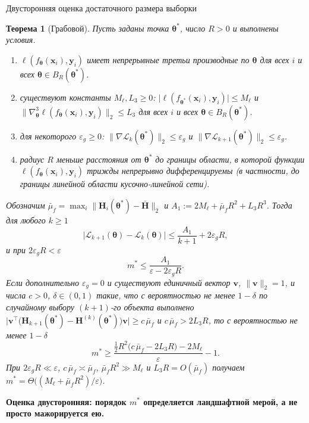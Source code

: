 \documentclass[9pt,pdf,hyperref={unicode}]{beamer}
\newtheorem{rustheorem}{Теорема}
\newcommand{\key}[1]{\par\vspace{0.5ex}\noindent\textbf{\color{darkgreen}#1}}
\begin{document}
\begin{frame}{Двусторонняя оценка достаточного размера выборки}
\justifying
\footnotesize
\begin{rustheorem}[Грабовой]
    Пусть заданы точка $\boldsymbol{\theta}^*$, число $R>0$ и выполнены условия.
    \begin{enumerate}[1)]
        \item $\ell(f_{\boldsymbol{\theta}}(\mathbf{x}_i),\mathbf{y}_i)$ имеет непрерывные третьи производные по $\boldsymbol{\theta}$ для всех $i$ и всех $\boldsymbol{\theta}\in B_R(\boldsymbol{\theta}^*)$.
        \item существуют константы $M_\ell,L_3\ge 0$: $\bigl|\ell(f_{\boldsymbol{\theta}^*}(\mathbf{x}_i),\mathbf{y}_i)\bigr|\le M_\ell$ и $\bigl\|\nabla^{3}_{\boldsymbol{\theta}}\ell(f_{\boldsymbol{\theta}}(\mathbf{x}_i),\mathbf{y}_i)\bigr\|_2\le L_3$ для всех $i$ и всех $\boldsymbol{\theta}\in B_R(\boldsymbol{\theta}^*)$.
        \item для некоторого $\varepsilon_g\ge 0$: $\bigl\|\nabla\mathcal{L}_k(\boldsymbol{\theta}^*)\bigr\|_2\le\varepsilon_g$ и $\bigl\|\nabla\mathcal{L}_{k+1}(\boldsymbol{\theta}^*)\bigr\|_2\le\varepsilon_g$.
        \item радиус $R$ меньше расстояния от $\boldsymbol{\theta}^*$ до границы области, в которой функции $\ell(f_{\boldsymbol{\theta}}(\mathbf{x}_i),\mathbf{y}_i)$ трижды непрерывно дифференцируемы (в частности, до границы линейной области кусочно-линейной сети).
    \end{enumerate}
    Обозначим $\bar\mu_f=\max_i\|\mathbf{H}_i(\boldsymbol{\theta}^*)-\bar{\mathbf{H}}\|_2$ и $A_1:=2M_\ell+\bar\mu_f R^2+L_3 R^3$. Тогда для любого $k\ge 1$
    \[
        \bigl|\mathcal{L}_{k+1}(\boldsymbol{\theta})-\mathcal{L}_k(\boldsymbol{\theta})\bigr|
        \le\frac{A_1}{k+1}+2\varepsilon_gR,
    \]
    и при $2\varepsilon_gR<\varepsilon$
    \[
        m^*\le\frac{A_1}{\varepsilon-2\varepsilon_gR}.
    \]
    Если дополнительно $\varepsilon_g=0$ и существуют единичный вектор $\mathbf{v}$, $\|\mathbf{v}\|_2=1$, и числа $c>0$, $\delta\in(0,1)$ такие, что с вероятностью не менее $1-\delta$ по случайному выбору $(k+1)$-го объекта выполнено $\bigl|\mathbf{v}^{\top}\bigl(\mathbf{H}_{k+1}(\boldsymbol{\theta}^*)-\mathbf{H}^{(k)}(\boldsymbol{\theta}^*)\bigr)\mathbf{v}\bigr|\ge c\,\bar\mu_f$ и $c\,\bar\mu_f>2L_3R$, то с вероятностью не менее $1-\delta$
    \[
        m^*\ge\frac{\tfrac12 R^2\bigl(c\,\bar\mu_f-2L_3R\bigr)-2M_\ell}{\varepsilon}-1 .
    \]
    При $2\varepsilon_gR\ll\varepsilon$, $c\,\bar\mu_f\asymp\bar\mu_f$, $\bar\mu_f R^2\gg M_\ell$ и $L_3R=O(\bar\mu_f)$ получаем $m^*=\Theta\bigl((M_\ell+\bar\mu_f R^2)/\varepsilon\bigr)$.
\end{rustheorem}
\key{Оценка двусторонняя: порядок $m^*$ определяется ландшафтной мерой, а не просто мажорируется ею.}
\end{frame}
\end{document}
